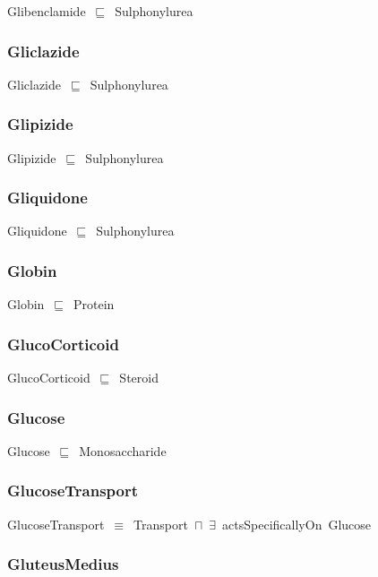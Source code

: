 \documentclass{article}
\begin{document}
Glibenclamide~\ensuremath{\sqsubseteq}~Sulphonylurea~

\subsubsection*{Gliclazide}

Gliclazide~\ensuremath{\sqsubseteq}~Sulphonylurea~

\subsubsection*{Glipizide}

Glipizide~\ensuremath{\sqsubseteq}~Sulphonylurea~

\subsubsection*{Gliquidone}

Gliquidone~\ensuremath{\sqsubseteq}~Sulphonylurea~

\subsubsection*{Globin}

Globin~\ensuremath{\sqsubseteq}~Protein~

\subsubsection*{GlucoCorticoid}

GlucoCorticoid~\ensuremath{\sqsubseteq}~Steroid~

\subsubsection*{Glucose}

Glucose~\ensuremath{\sqsubseteq}~Monosaccharide~

\subsubsection*{GlucoseTransport}

GlucoseTransport~\ensuremath{\equiv}~Transport~\ensuremath{\sqcap}~\ensuremath{\exists}~actsSpecificallyOn~Glucose

\subsubsection*{GluteusMedius}
\end{document}
